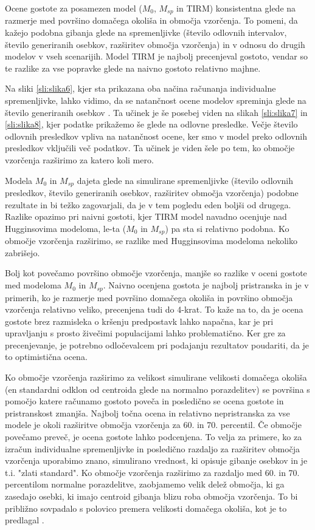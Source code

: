 Ocene gostote za posamezen model ($M_0$, $M_{sp}$ in TIRM) konsistentna glede na razmerje med površino domačega okoliša in območja vzorčenja. To pomeni, da kažejo podobna gibanja glede na spremenljivke (število odlovnih intervalov, število generiranih osebkov, razširitev območja vzorčenja) in v odnosu do drugih modelov v vseh scenarijih. Model TIRM je najbolj precenjeval gostoto, vendar so te razlike za vse popravke glede na naivno gostoto relativno majhne.

Na sliki \ref{sli:slika6}, kjer sta prikazana oba načina računanja individualne spremenljivke, lahko vidimo, da se natančnost ocene modelov spreminja glede na število generiranih osebkov \citep{eberhardt_using_1990}. Ta učinek je še posebej viden na slikah \ref{sli:slika7} in \ref{sli:slika8}, kjer podatke prikažemo še glede na odlovne presledke. Večje število odlovnih presledkov vpliva na natančnost ocene, ker smo v model preko odlovnih presledkov vključili več podatkov. Ta učinek je viden šele po tem, ko območje vzorčenja razširimo za katero koli mero.

Modela $M_0$ in $M_{sp}$ dajeta glede na simulirane spremenljivke (število odlovnih presledkov, število generiranih osebkov, razširitev območja vzorčenja) podobne rezultate in bi težko zagovarjali, da je v tem pogledu eden boljši od drugega. Razlike opazimo pri naivni gostoti, kjer TIRM model navadno ocenjuje nad Hugginsovima modeloma, le-ta ($M_0$ in $M_{sp}$) pa sta si relativno podobna. Ko območje vzorčenja razširimo, se razlike med Hugginsovima modeloma nekoliko zabrišejo.

Bolj kot povečamo površino območje vzorčenja, manjše so razlike v oceni gostote med modeloma $M_0$ in $M_{sp}$. Naivno ocenjena gostota je najbolj pristranska in je v primerih, ko je razmerje med površino domačega okoliša in površino območja vzorčenja relativno veliko, precenjena tudi do 4-krat. To kaže na to, da je ocena gostote brez razmisleka o kršenju predpostavk lahko napačna, kar je pri upravljanju s prosto živečimi populacijami lahko problematično. Ker gre za precenjevanje, je potrebno odločevalcem pri podajanju rezultatov poudariti, da je to optimistična ocena.

Ko območje vzorčenja razširimo za velikost simulirane velikosti domačega okoliša (en standardni odklon od centroida glede na normalno porazdelitev) se površina s pomočjo katere računamo gostoto poveča in posledično se ocena gostote in pristranskost zmanjša. Najbolj točna ocena in relativno nepristranska za vse modele je okoli razširitve območja vzorčenja za 60. in 70. percentil. Če območje povečamo preveč, je ocena gostote lahko podcenjena. To velja za primere, ko za izračun individualne spremenljivke in posledično razdaljo za razširitev območja vzorčenja uporabimo znano, simulirano vrednost, ki opisuje gibanje osebkov in je t.i. "zlati standard". Ko območje vzorčenja razširimo za razdaljo med 60. in 70. percentilom normalne porazdelitve, zaobjamemo velik delež območja, ki ga zasedajo osebki, ki imajo centroid gibanja blizu roba območja vzorčenja. To bi približno sovpadalo s polovico premera velikosti domačega okoliša, kot je to predlagal \citep{dice_census_1938}.

